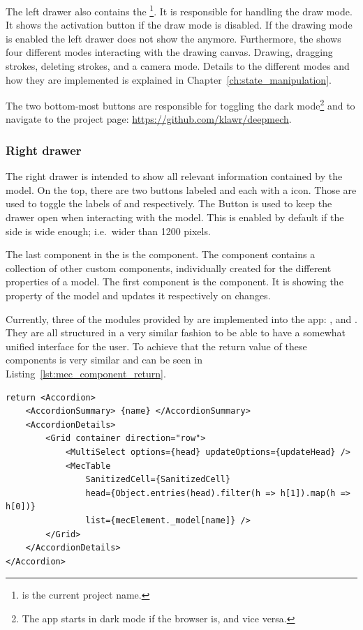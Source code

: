 The left drawer also contains the \footnote{ is the current project name.}.
It is responsible for handling the draw mode.
It shows the activation button if the draw mode is disabled.
If the drawing mode is enabled the left drawer does not show the  anymore.
Furthermore, the  shows four different modes interacting with the drawing canvas.
Drawing, dragging strokes, deleting strokes, and a camera mode.
Details to the different modes and how they are implemented is explained in Chapter~\ref{ch:state_manipulation}.

The two bottom-most buttons are responsible for toggling the dark mode\footnote{The app starts in dark mode if the browser is, and vice versa.} and to navigate to the project page: \url{https://github.com/klawr/deepmech}.

\subsubsection{Right drawer}

The right drawer is intended to show all relevant information contained by the  model.
On the top, there are two buttons labeled  and  each with a  icon.
Those are used to toggle the labels of  and  respectively.
The  Button is used to keep the drawer open when interacting with the model.
This is enabled by default if the side is wide enough; i.e.\ wider than 1200 pixels.

The last component in the  is the  component.
The  component contains a collection of other custom components, individually created for the different properties of a  model.
The  first component is the  component.
It is showing the  property of the  model and updates it respectively on changes.

Currently, three of the modules provided by  are implemented into the app:
,  and .
They are all structured in a very similar fashion to be able to have a somewhat unified interface for the user.
To achieve that the return value of these components is very similar and can be seen in Listing~\ref{lst:mec_component_return}.

\begin{lstlisting}[label={lst:mec_component_return}, caption={Return value of a custom \name{mec2} component.}]
return <Accordion>
    <AccordionSummary> {name} </AccordionSummary>
    <AccordionDetails>
        <Grid container direction="row">
            <MultiSelect options={head} updateOptions={updateHead} />
            <MecTable
                SanitizedCell={SanitizedCell}
                head={Object.entries(head).filter(h => h[1]).map(h => h[0])}
                list={mecElement._model[name]} />
        </Grid>
    </AccordionDetails>
</Accordion>
\end{lstlisting}

